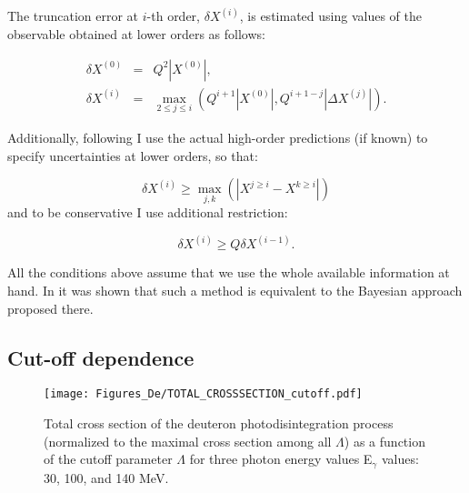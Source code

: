     The truncation error at $i$-th order, $\delta X^{(i)}$, is estimated using
     values of the observable obtained at lower 
    orders as follows:

    \begin{eqnarray}
        \delta X^{(0)} &=& Q^2 \left| X^{(0)} \right| \label{trunc2},\\ 
        \delta X^{(i)} &=& \max_{2 \leq j \leq i} \left( Q^{i+1} \left| X^{(0)} \right|,
        Q^{i+1-j} \left| \Delta X^{(j)} \right| \right). \label{trunc3} 
    \end{eqnarray}

    Additionally, following \cite{Binder2015} I use the actual high-order predictions 
    (if known) to specify uncertainties at lower orders, so that:

    \begin{equation}
        \delta X^{(i)} \geq \max_{j,k} (|X^{j \geq i} - X^{k \geq i}|)
        \label{trunc4}
    \end{equation}
    and to be conservative I use additional restriction:

    \begin{equation}
        \delta X^{(i)} \geq Q \delta X^{(i-1)}.
        \label{trunc5}
    \end{equation}

    All the conditions above assume that we use the whole available information at hand.
    In \cite{Melendez_BayesTrunc} it was shown that such a method is equivalent
    to the Bayesian approach proposed there.


    \subsection*{Cut-off dependence}



    \begin{figure}[htb]
        \begin{center}
            \texttt{[image: Figures\_De/TOTAL\_CROSSSECTION\_cutoff.pdf]}
        \end{center}
        \caption{Total cross section of the deuteron photodisintegration
        process (normalized to the maximal cross section among all $\Lambda$)
        as a function of the cutoff parameter $\Lambda$ 
        for three photon energy values E$_\gamma$ values: 30, 100, and 140 MeV.}
        \label{Cutoff_dep}
        \end{figure}

